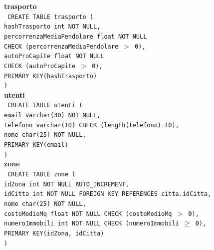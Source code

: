 \documentclass[a4paper,12pt]{report}
\begin{document}
                \newpage
                \noindent
                {\large \textbf{trasporto}} \\
                \texttt{
                    CREATE TABLE trasporto ( \\
                    \null\quad\quad hashTrasporto int NOT NULL, \\
                    \null\quad\quad percorrenzaMediaPendolare   float   NOT NULL \\
                            \null\qquad\qquad CHECK (percorrenzaMediaPendolare $>$ 0), \\
                    \null\quad\quad autoProCapite               float   NOT NULL \\
                            \null\qquad\qquad CHECK (autoProCapite $>$ 0), \\
                    \null\quad\quad PRIMARY KEY(hashTrasporto) \\
                    )
                } \\

                \noindent
                {\large \textbf{utenti}} \\
                \texttt{
                    CREATE TABLE utenti ( \\
                    \null\quad\quad email      varchar(30)     NOT NULL, \\
                    \null\quad\quad telefono    varchar(10)     CHECK (length(telefono)=10), \\
                    \null\quad\quad nome        char(25)    NOT NULL, \\
                    \null\quad\quad PRIMARY KEY(email) \\
                    )
                } \\

                \noindent
                {\large \textbf{zone}} \\
                \texttt{
                    CREATE TABLE zone ( \\
                    \null\quad\quad idZona          int         NOT NULL AUTO\_INCREMENT, \\
                    \null\quad\quad idCitta         int         NOT NULL FOREIGN KEY REFERENCES citta.idCitta, \\
                    \null\quad\quad nome            char(25)    NOT NULL, \\
                    \null\quad\quad costoMedioMq    float       NOT NULL CHECK (costoMedioMq $>$ 0), \\
                    \null\quad\quad numeroImmobili  int         NOT NULL CHECK (numeroImmobili $\geq$ 0), \\
                    \null\quad\quad PRIMARY KEY(idZona, idCitta) \\
                    )
                }
\end{document}
